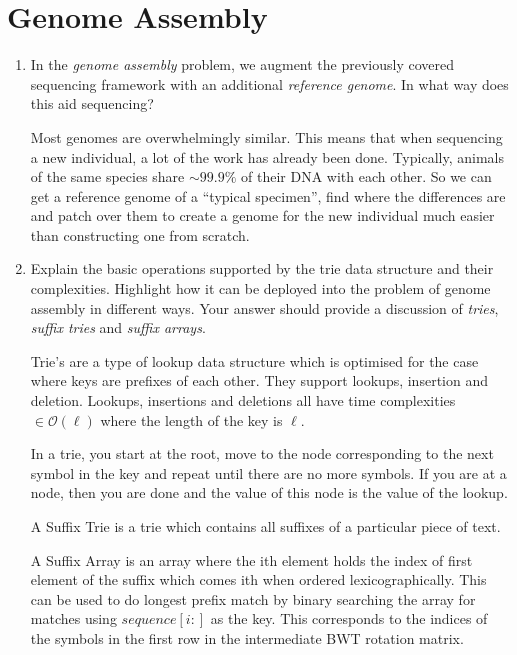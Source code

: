 \documentclass[10pt,\jkfside,a4paper]{article}
\begin{document}
\section{Genome Assembly}

\begin{enumerate}

    \item In the \textit{genome assembly} problem, we augment the previously covered sequencing framework with an additional \textit{reference genome}. In what way does this aid sequencing?

    Most genomes are overwhelmingly similar. This means that when sequencing a new individual, a lot of the work has already been done. Typically, animals of the same species share $\sim 99.9\%$ of their DNA with
    each other. So we can get a reference genome of a ``typical specimen'', find where the differences are and patch over them to create a genome for the new individual much easier than constructing one from
    scratch.

    \item Explain the basic operations supported by the trie data structure and their complexities. Highlight how it can be deployed into the problem of genome assembly in different ways. Your answer should
    provide a discussion of \textit{tries}, \textit{suffix tries} and \textit{suffix arrays}.

    Trie's are a type of lookup data structure which is optimised for the case where keys are prefixes of each other. They support lookups, insertion and deletion. Lookups, insertions and deletions all have time
    complexities $\in \mathcal O(\ell)$ where the length of the key is $\ell$.

    In a trie, you start at the root, move to the node corresponding to the next symbol in the key and repeat until there are no more symbols. If you are at a node, then you are done and the value
    of this node is the value of the lookup.

    A Suffix Trie is a trie which contains all suffixes of a particular piece of text.

    A Suffix Array is an array where the ith element holds the index of first element of the suffix which comes ith when ordered lexicographically. This can be used to do longest prefix match by binary
    searching the array for matches using $\mathit{sequence}[i:]$ as the key. This corresponds to the indices of the symbols in the first row in the intermediate BWT rotation matrix.


\end{enumerate}
\end{document}
